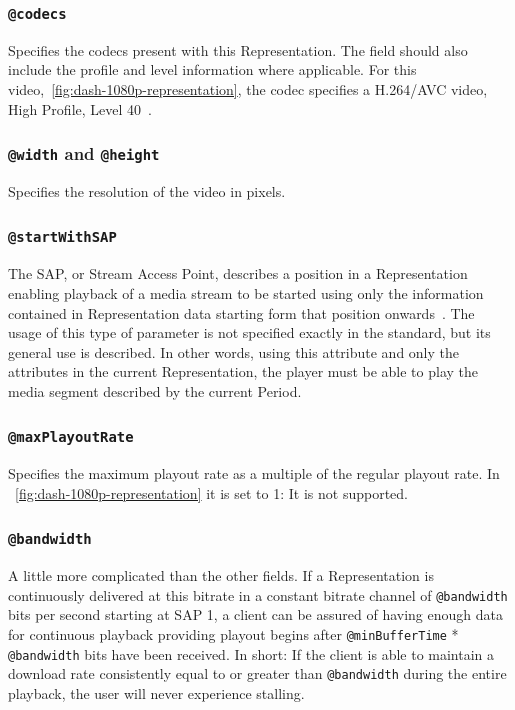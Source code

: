 \subsubsection{\texttt{@codecs}}
Specifies the codecs present with this
Representation. The field should also include the profile and level
information where applicable. For this video,~\cref{fig:dash-1080p-representation}, the codec specifies a
H.264/AVC video, High Profile, Level 40~\cite[p. 12]{rfc6381}.

\subsubsection{\texttt{@width} and \texttt{@height}}
Specifies the resolution of the video in pixels.

\subsubsection{\texttt{@startWithSAP}}
The SAP, or Stream Access Point, describes a position in a Representation
enabling playback of a media stream to be started using only the information
contained in Representation data starting form that position
onwards~\cite[p. 11]{iso-dash-2014}. The usage of this type of parameter
is not specified exactly in the standard, but its general use is described.
In other words, using this attribute and only the attributes in the
current Representation, the player must be able to play the media segment
described by the current Period.

\subsubsection{\texttt{@maxPlayoutRate}}
Specifies the maximum playout rate as a multiple of the
regular playout rate. In ~\cref{fig:dash-1080p-representation} it is set to 1: It is not supported.

\subsubsection{\texttt{@bandwidth}}
A little more complicated than the other fields.
If a Representation is continuously delivered at this bitrate in a
constant bitrate channel of \texttt{@bandwidth} bits per second starting at
SAP 1, a client
can be assured of having enough data for continuous playback providing
playout begins after \texttt{@minBufferTime} * \texttt{@bandwidth} bits have been
received. In short: If the client is able to maintain a download rate
consistently equal to or greater than \texttt{@bandwidth} during the entire
playback, the user will never experience stalling.

